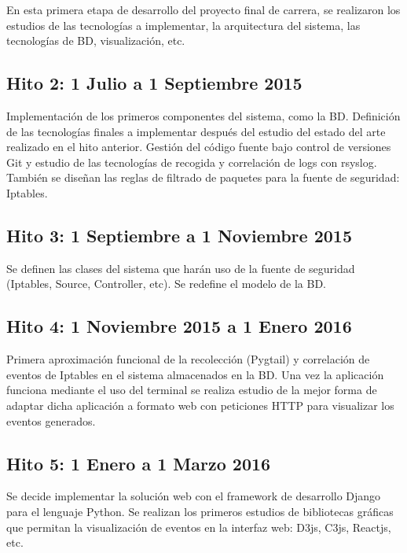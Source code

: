 En esta primera etapa de desarrollo del proyecto final de carrera, se realizaron los estudios de las tecnologías a implementar, la arquitectura del sistema, las tecnologías de BD, visualización, etc.

\subsection{Hito 2: 1 Julio a 1 Septiembre 2015}
\label{subsec:hito2}

Implementación de los primeros componentes del sistema, como la BD. Definición de las tecnologías finales a implementar después del estudio del estado del arte realizado en el hito anterior. Gestión del código fuente bajo control de versiones Git y estudio de las tecnologías de recogida y correlación de logs con rsyslog. También se diseñan las reglas de filtrado de paquetes para la fuente de seguridad: Iptables.

\subsection{Hito 3: 1 Septiembre a 1 Noviembre 2015}
\label{subsec:hito3}

Se definen las clases del sistema que harán uso de la fuente de seguridad (Iptables, Source, Controller, etc). Se redefine el modelo de la BD.

\subsection{Hito 4: 1 Noviembre 2015 a 1 Enero 2016}
\label{subsec:hito4}

Primera aproximación funcional de la recolección (Pygtail) y correlación de eventos de Iptables en el sistema almacenados en la BD. Una vez la aplicación funciona mediante el uso del terminal se realiza estudio de la mejor forma de adaptar dicha aplicación a formato web con peticiones HTTP para visualizar los eventos generados.

\subsection{Hito 5: 1 Enero a 1 Marzo 2016}
\label{subsec:hito5}

Se decide implementar la solución web con el framework de desarrollo Django para el lenguaje Python. Se realizan los primeros estudios de bibliotecas gráficas que permitan la visualización de eventos en la interfaz web: D3js, C3js, Reactjs, etc.

